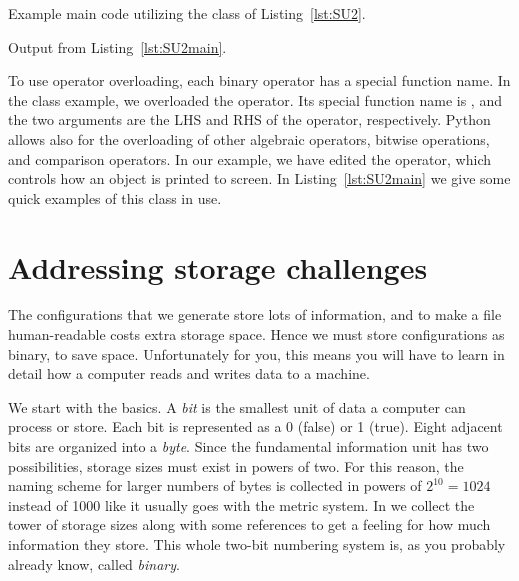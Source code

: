 \begin{code*}
\caption{Example main code utilizing the  class
of Listing~\ref{lst:SU2}.}
\label{lst:SU2main}
\end{code*}
\begin{code*}
\caption{Output from Listing~\ref{lst:SU2main}.}
\end{code*}

To use operator overloading, each binary operator has a special function name.
In the  class example, we overloaded the \ff{+} operator. Its special
function name is , and the two arguments are the LHS and
RHS of the operator, respectively. Python allows also for the overloading
of other algebraic operators, bitwise operations, and comparison operators.
In our example, we have edited the  operator, which
controls how an  object is printed to screen.
In Listing~\ref{lst:SU2main} we give some quick examples of 
this  class in use. 


\section{Addressing storage challenges}

The configurations that we generate store lots of information, and to make a
file human-readable costs extra storage space. Hence we must store
configurations as binary, to save space. Unfortunately for you,
this means you will have to learn in detail how a computer reads and writes data
to a machine.

We start with the basics. A {\it bit} is the smallest unit of data a computer
can process or store. Each bit is represented as a 0 (false) or 1 (true).
Eight adjacent bits are organized into a {\it byte}.
Since the fundamental information unit has two possibilities, storage
sizes must exist in powers of two. For this reason, the naming scheme
for larger numbers of bytes is collected in powers of $2^{10}=1024$
instead of 1000 like it usually goes with the metric system.
In  we collect the tower of storage sizes
along with some references to get a feeling for how much information
they store. This whole two-bit numbering system is, as you probably
already know, called {\it binary}.

